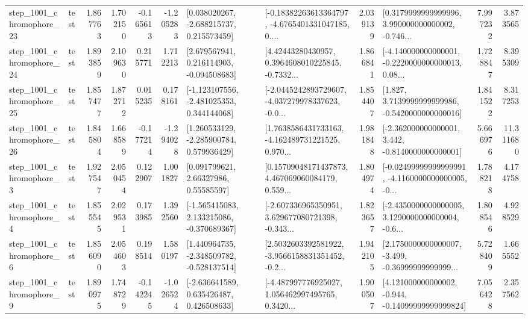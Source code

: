 \begin{tabular}{llrrrrllrlrr}
 step\_1001\_chromophore\_23 &      test &      1.867763 &    1.702150 &     -0.165613 & -1.205283 &    [0.038020267, -2.688215737, 0.215573459] &  [-0.18382263613364797, -4.6765401331047185, 0.... &       2.039139 &  [0.3179999999999996, 3.990000000000002, -0.746... &            7.997232 &          3.873565 \\
 step\_1001\_chromophore\_24 &      test &      1.893859 &    2.109630 &      0.215771 &  1.712213 &    [2.679567941, 0.216114903, -0.094508683] &  [4.42443280430957, 0.3964608010225845, -0.7332... &       1.866841 &  [-4.140000000000001, -0.2220000000000013, 0.08... &            1.728847 &          8.395309 \\
 step\_1001\_chromophore\_25 &      test &      1.857477 &    1.872712 &      0.015235 &  0.178161 &   [-1.123107556, -2.481025353, 0.344144068] &  [-2.0445242893729607, -4.037279978337623, -0.0... &       1.854407 &   [1.827, 3.7139999999999986, -0.5420000000000016] &            1.841522 &          8.317253 \\
 step\_1001\_chromophore\_26 &      test &      1.845804 &    1.668589 &     -0.177214 & -1.294028 &    [1.260533129, -2.285900784, 0.579936429] &  [1.7638586431733163, -4.162489731221525, 0.970... &       1.981848 &   [-2.362000000000001, 3.442, -0.8140000000000001] &            5.666976 &         11.311680 \\
  step\_1001\_chromophore\_3 &      test &      1.927547 &    2.050454 &      0.122907 &  1.001827 &       [0.091799621, 2.66327986, 0.55585597] &  [0.15709048171437873, 4.467069060084179, 0.559... &       1.804974 &  [-0.02499999999999991, -4.1160000000000005, -0... &            1.788218 &          4.174758 \\
  step\_1001\_chromophore\_4 &      test &      1.855545 &    2.029531 &      0.173985 &  1.392560 &   [-1.565415083, 2.133215086, -0.370689367] &  [-2.607336965350951, 3.629677080721398, -0.343... &       1.823657 &  [-2.4350000000000005, 3.1290000000000004, -0.6... &            1.808546 &          4.928529 \\
  step\_1001\_chromophore\_6 &      test &      1.856090 &    2.054603 &      0.198514 &  1.580197 &   [1.440964735, -2.348509782, -0.528137514] &  [2.5032603392581922, -3.9566158831351452, -0.2... &       1.942105 &  [2.1750000000000007, -3.499, -0.36999999999999... &            5.728409 &          1.665552 \\
  step\_1001\_chromophore\_9 &      test &      1.890975 &    1.748729 &     -0.142245 & -1.026524 &    [-2.636641589, 0.635426487, 0.426508633] &  [-4.487997776925027, 1.056462997495765, 0.3420... &       1.900507 &  [4.121000000000002, -0.944, -0.14099999999999824] &            7.056428 &          2.357562 \\

\end{tabular}
